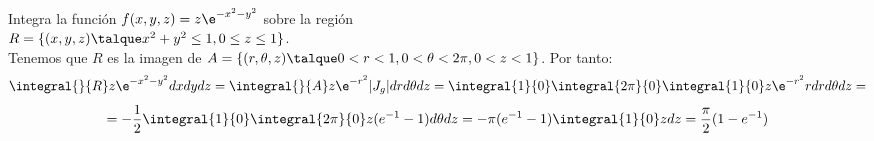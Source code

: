 \begin{ejem} Integra la función $f(x,y,z)=z\e^{-x^2-y^2}$ sobre la región\\
$R=\{(x,y,z)\talque x^2+y^2\leq1,0\leq z\leq1\}$.\\
Tenemos que $R$ es la imagen de $A=\{(r,\theta,z)\talque 0<r<1, 0<\theta<2\pi,0<z<1\}$. Por tanto:
\[\integral{}{R}z\e^{-x^2-y^2}dxdydz=\integral{}{A}z\e^{-r^2}|J_g|drd\theta dz=\integral{1}{0}\integral{2\pi}{0}\integral{1}{0}z\e^{-r^2}rdrd\theta dz=\]\[=-\dfrac{1}{2}\integral{1}{0}\integral{2\pi}{0}z(e^{-1}-1)d\theta dz=-\pi(e^{-1}-1)\integral{1}{0}zdz=\dfrac{\pi}{2}(1-e^{-1})\]
\end{ejem}